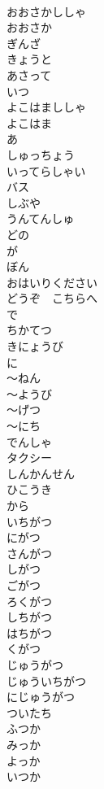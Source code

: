 \documentclass[8pt]{extreport}
\begin{document}
\begin{CJK}{UTF8}{min}
\\	おおさかししゃ		
\\	おおさか		
\\	ぎんざ		
\\	きょうと		
\\	あさって		
\\	いつ		
\\	よこはまししゃ		
\\	よこはま		
\\	あ		
\\	しゅっちょう		
\\	いってらしゃい		
\\	バス		
\\	しぶや		
\\	うんてんしゅ		
\\	どの		
\\	が		
\\	ぼん		
\\	おはいりください		
\\	どうぞ　こちらへ		
\\	で		
\\	ちかてつ		
\\	きにょうび		
\\	に		
\\	〜ねん		
\\	〜ようび		
\\	〜げつ		
\\	〜にち		
\\	でんしゃ		
\\	タクシー		
\\	しんかんせん		
\\	ひこうき		
\\	から		
\\	いちがつ		
\\	にがつ		
\\	さんがつ		
\\	しがつ		
\\	ごがつ		
\\	ろくがつ		
\\	しちがつ		
\\	はちがつ		
\\	くがつ		
\\	じゅうがつ		
\\	じゅういちがつ		
\\	にじゅうがつ		
\\	ついたち		
\\	ふつか		
\\	みっか		
\\	よっか		
\\	いつか		

\end{CJK}
\end{document}

